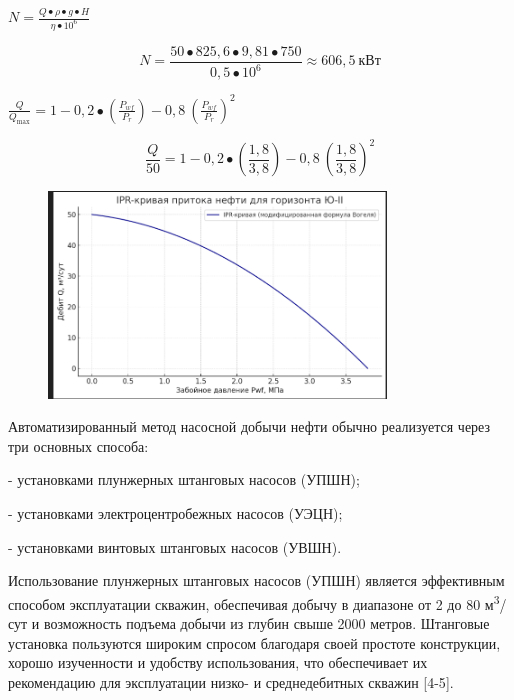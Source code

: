 \(N = \frac{Q \bullet \rho \bullet g \bullet H}{\eta \bullet 10^{6}}\)

\[N = \frac{50 \bullet 825,6 \bullet 9,81 \bullet 750}{0,5 \bullet 10^{6}} \approx 606,5\ кВт\]

\(\frac{Q}{Q_{\max}} = 1 - 0,2 \bullet \left( \frac{P_{wf}}{P_{r}} \right) - 0,8\ \left( \frac{P_{wf}}{P_{r}} \right)^{2}\)

\[\frac{Q}{50} = 1 - 0,2 \bullet \left( \frac{1,8}{3,8} \right) - 0,8\ \left( \frac{1,8}{3,8} \right)^{2}\]

\begin{figure}[H]
	\centering
	\includegraphics[width=0.8\textwidth]{media/gorn/image2}
	\caption*{}
\end{figure}

\begin{multicols}{2}
Автоматизированный метод насосной добычи нефти обычно реализуется через
три основных способа:

- установками плунжерных штанговых насосов (УПШН);

- установками электроцентробежных насосов (УЭЦН);

- установками винтовых штанговых насосов (УВШН).

Использование плунжерных штанговых насосов (УПШН) является эффективным
способом эксплуатации скважин, обеспечивая добычу в диапазоне от 2 до 80
м\textsuperscript{3}/сут и возможность подъема добычи из глубин свыше
2000 метров. Штанговые установка пользуются широким спросом благодаря
своей простоте конструкции, хорошо изученности и удобству использования,
что обеспечивает их рекомендацию для эксплуатации низко- и
среднедебитных скважин {[}4-5{]}.
\end{multicols}


